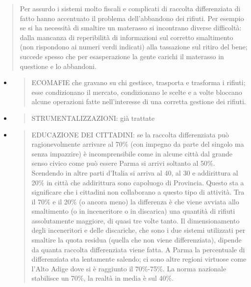 \documentclass[]{article}
\begin{document}
\begin{quote}
Per assurdo i sistemi molto fiscali e complicati di raccolta
differenziata di fatto hanno accentuato il problema dell'abbandono dei
rifiuti. Per esempio se si ha necessità di smaltire un materasso si
incontrano diverse difficoltà: dalla mancanza di reperibilità di
informazioni sul corretto smaltimento (non rispondono ai numeri verdi
indicati) alla tassazione sul ritiro del bene; succede spesso che per
esasperazione la gente carichi il materasso in questione e lo abbandoni.
\end{quote}

\begin{itemize}
\item
  \begin{quote}
  ECOMAFIE che gravano su chi gestisce, trasporta e trasforma i rifiuti;
  esse condizionano il mercato, condizionano le scelte e a volte
  bloccano alcune operazioni fatte nell'interesse di una corretta
  gestione dei rifiuti.
  \end{quote}
\item
  \begin{quote}
  STRUMENTALIZZAZIONI: già trattate
  \end{quote}
\item
  \begin{quote}
  EDUCAZIONE DEI CITTADINI: se la raccolta differenziata può
  ragionevolmente arrivare al 70\% (con impegno da parte del singolo ma
  senza impazzire) è incomprensibile come in alcune città dal grande
  senso civico come può essere Parma si arrivi soltanto al 50\%.
  Scendendo in altre parti d'Italia si arriva al 40, al 30 e addirittura
  al 20\% in città che addirittura sono capoluogo di Provincia. Questo
  sta a significare che i cittadini non collaborano a questo tipo di
  attività. Tra il 70\% e il 20\% (o ancora meno) la differenza è che
  viene avviata allo smaltimento (o in inceneritore o in discarica) una
  quantità di rifiuti assolutamente maggiore, di quasi tre volte tanto.
  Il dimensionamento degli inceneritori e delle discariche, che sono i
  due sistemi utilizzati per smaltire la quota residua (quella che non
  viene differenziata), dipende da quanta raccolta differenziata viene
  fatta. A Parma la percentuale di differenziata sta lentamente salendo;
  ci sono altre regioni virtuose come l'Alto Adige dove si è raggiunto
  il 70\%-75\%. La norma nazionale stabilisce un 70\%, la realtà in
  media è sul 40\%.
  \end{quote}
\end{itemize}
\end{document}

